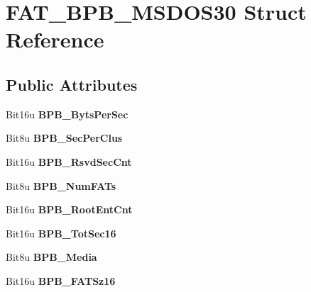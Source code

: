 \hypertarget{structFAT__BPB__MSDOS30}{\section{F\-A\-T\-\_\-\-B\-P\-B\-\_\-\-M\-S\-D\-O\-S30 Struct Reference}
\label{structFAT__BPB__MSDOS30}
}
\subsection*{Public Attributes}
\begin{DoxyCompactItemize}
\item 
\hypertarget{structFAT__BPB__MSDOS30_a5c901c8abb655a50b46e02b7ee47de6f}{Bit16u {\bfseries B\-P\-B\-\_\-\-Byts\-Per\-Sec}}\label{structFAT__BPB__MSDOS30_a5c901c8abb655a50b46e02b7ee47de6f}

\item 
\hypertarget{structFAT__BPB__MSDOS30_a0cde3141979b7c093de29584020b514e}{Bit8u {\bfseries B\-P\-B\-\_\-\-Sec\-Per\-Clus}}\label{structFAT__BPB__MSDOS30_a0cde3141979b7c093de29584020b514e}

\item 
\hypertarget{structFAT__BPB__MSDOS30_a6c8854ee0f9a23eb60655f9bf0450fc9}{Bit16u {\bfseries B\-P\-B\-\_\-\-Rsvd\-Sec\-Cnt}}\label{structFAT__BPB__MSDOS30_a6c8854ee0f9a23eb60655f9bf0450fc9}

\item 
\hypertarget{structFAT__BPB__MSDOS30_a3e26d49191babf28c8990b1220b49bf6}{Bit8u {\bfseries B\-P\-B\-\_\-\-Num\-F\-A\-Ts}}\label{structFAT__BPB__MSDOS30_a3e26d49191babf28c8990b1220b49bf6}

\item 
\hypertarget{structFAT__BPB__MSDOS30_a81d167a8eb2c4e2ff7fd6ebbedc24efc}{Bit16u {\bfseries B\-P\-B\-\_\-\-Root\-Ent\-Cnt}}\label{structFAT__BPB__MSDOS30_a81d167a8eb2c4e2ff7fd6ebbedc24efc}

\item 
\hypertarget{structFAT__BPB__MSDOS30_ac5df80d2f14be22485b81f651a3f34d3}{Bit16u {\bfseries B\-P\-B\-\_\-\-Tot\-Sec16}}\label{structFAT__BPB__MSDOS30_ac5df80d2f14be22485b81f651a3f34d3}

\item 
\hypertarget{structFAT__BPB__MSDOS30_a5abbaf8858e1b69a21d4184d2b999111}{Bit8u {\bfseries B\-P\-B\-\_\-\-Media}}\label{structFAT__BPB__MSDOS30_a5abbaf8858e1b69a21d4184d2b999111}

\item 
\hypertarget{structFAT__BPB__MSDOS30_af3f385142f88512497476f9ed9c53a40}{Bit16u {\bfseries B\-P\-B\-\_\-\-F\-A\-T\-Sz16}}\label{structFAT__BPB__MSDOS30_af3f385142f88512497476f9ed9c53a40}


\end{DoxyCompactItemize}
